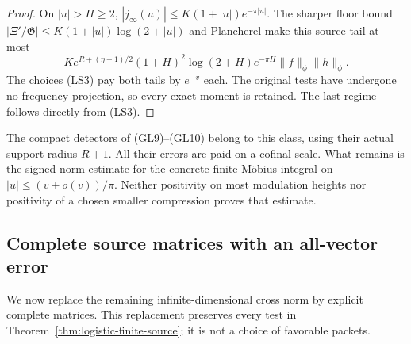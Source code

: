 \documentclass[11pt]{article}
\theoremstyle{remark}\newtheorem{remark}[theorem]{Remark}
\begin{document}
\begin{proof}
On \(|u|>H\ge2\), \(|j_\infty(u)|\le K(1+|u|)e^{-\pi|u|}\).
The sharper floor bound \(|\Xi'/\mathfrak G|\le
K(1+|u|)\log(2+|u|)\) and Plancherel make this source tail
at most
\[
 K e^{R+(\eta+1)/2}(1+H)^2\log(2+H)e^{-\pi H}
                                             \|f\|_\phi\|h\|_\phi.
\]
The choices (LS3) pay both tails by \(e^{-v}\) each. The original
tests have undergone no frequency projection, so every exact
moment is retained. The last regime follows directly from (LS3).
\end{proof}

The compact detectors of (GL9)--(GL10) belong to this class,
using their actual support radius \(R+1\). All their errors are
paid on a cofinal scale. What remains is the signed norm estimate
for the concrete finite Möbius integral on \(|u|\le(v+o(v))/\pi\).
Neither positivity on most modulation heights nor positivity of a
chosen smaller compression proves that estimate.

\subsection{Complete source matrices with an all-vector error}
\label{sec:complete-source-matrices}

We now replace the remaining infinite-dimensional cross norm by
explicit complete matrices. This replacement preserves every test
in Theorem~\ref{thm:logistic-finite-source}; it is not a choice of
favorable packets.
\end{document}
